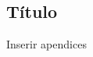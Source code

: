 \appendix

\begin{apendicesenv} %
	\partapendices
	\chapter{Título}
	
	Inserir apendices
	
\end{apendicesenv}%